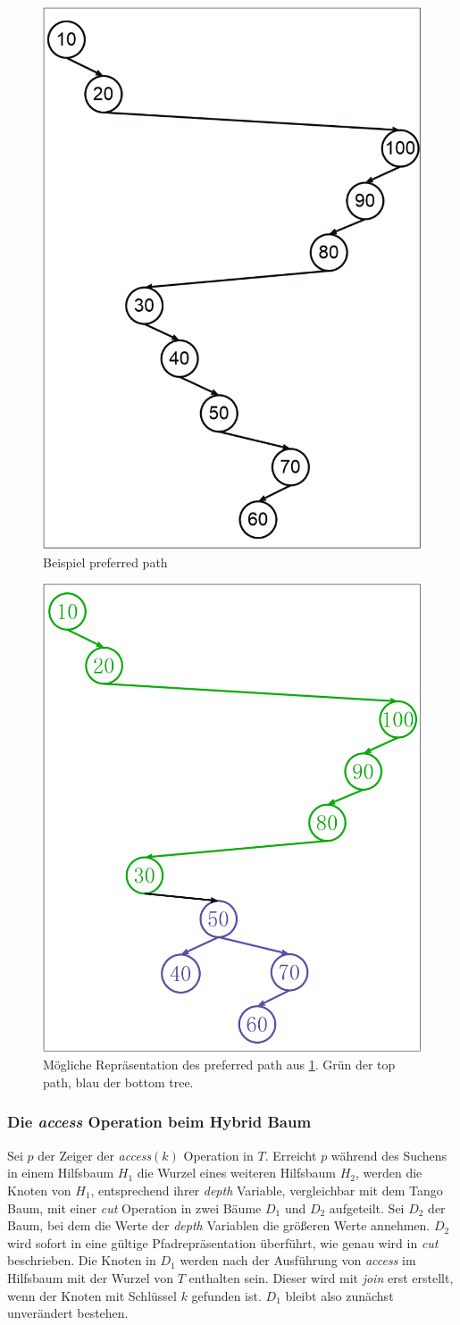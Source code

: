\documentclass[a4paper,12pt]{article}
\begin{document}
\begin{figure}[h]
	\centering
	\includegraphics[height= 0.5\textwidth]{"Medien/Zipper/preferredPath"}
	\caption{Beispiel preferred path }
	\label{fig:preferredPath}
\end{figure} 
\begin{figure}[h]
	\centering
	\includegraphics[height= 0.5\textwidth]{"Medien/Zipper/hybrid/pathRepresentation"}
	\caption{Mögliche Repräsentation des preferred path aus \ref{fig:preferredPath}. Grün der top path, blau der bottom tree. }
	\label{fig:pathRepresentation}
\end{figure} 


\subsubsection{Die \textit{access} Operation beim Hybrid Baum}
Sei $p$ der Zeiger der \textit{access}$\left(k\right)$ Operation in $T$. Erreicht $p$ während des Suchens in einem Hilfsbaum $H_1$ die Wurzel eines weiteren Hilfsbaum $H_2$, werden die Knoten von $H_1$, entsprechend ihrer \textit{depth} Variable, vergleichbar mit dem Tango Baum,  mit einer \textit{cut} Operation in zwei Bäume $D_1$ und $D_2$ aufgeteilt. Sei $D_2$ der Baum, bei dem die Werte der \textit{depth} Variablen die größeren Werte annehmen. $D_2$ wird sofort in eine gültige Pfadrepräsentation überführt, wie genau wird in \textit{cut} beschrieben. Die Knoten in $D_1$ werden nach der Ausführung von \textit{access} im Hilfsbaum mit der Wurzel von $T$ enthalten sein. Dieser wird mit \textit{join} erst erstellt, wenn der Knoten mit Schlüssel $k$ gefunden ist. $D_1$ bleibt also zunächst unverändert bestehen.       
\end{document}
